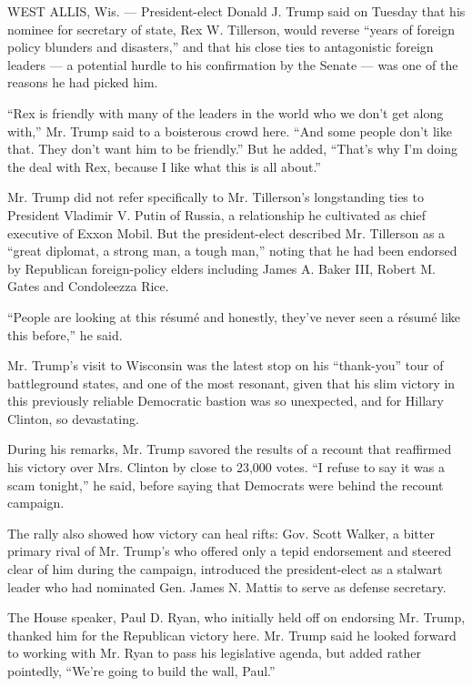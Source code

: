 WEST ALLIS, Wis. --- President-elect Donald J. Trump said on Tuesday
that his nominee for secretary of state, Rex W. Tillerson, would reverse
``years of foreign policy blunders and disasters,'' and that his close
ties to antagonistic foreign leaders --- a potential hurdle to his
confirmation by the Senate --- was one of the reasons he had picked him.

``Rex is friendly with many of the leaders in the world who we don't get
along with,'' Mr. Trump said to a boisterous crowd here. ``And some
people don't like that. They don't want him to be friendly.'' But he
added, ``That's why I'm doing the deal with Rex, because I like what
this is all about.''

Mr. Trump did not refer specifically to Mr. Tillerson's longstanding
ties to President Vladimir V. Putin of Russia, a relationship he
cultivated as chief executive of Exxon Mobil. But the president-elect
described Mr. Tillerson as a ``great diplomat, a strong man, a tough
man,'' noting that he had been endorsed by Republican foreign-policy
elders including James A. Baker III, Robert M. Gates and Condoleezza
Rice.

``People are looking at this résumé and honestly, they've never seen a
résumé like this before,'' he said.

Mr. Trump's visit to Wisconsin was the latest stop on his ``thank-you''
tour of battleground states, and one of the most resonant, given that
his slim victory in this previously reliable Democratic bastion was so
unexpected, and for Hillary Clinton, so devastating.

During his remarks, Mr. Trump savored the results of a recount that
reaffirmed his victory over Mrs. Clinton by close to 23,000 votes. ``I
refuse to say it was a scam tonight,'' he said, before saying that
Democrats were behind the recount campaign.

The rally also showed how victory can heal rifts: Gov. Scott Walker, a
bitter primary rival of Mr. Trump's who offered only a tepid endorsement
and steered clear of him during the campaign, introduced the
president-elect as a stalwart leader who had nominated Gen. James N.
Mattis to serve as defense secretary.

The House speaker, Paul D. Ryan, who initially held off on endorsing Mr.
Trump, thanked him for the Republican victory here. Mr. Trump said he
looked forward to working with Mr. Ryan to pass his legislative agenda,
but added rather pointedly, ``We're going to build the wall, Paul.''


